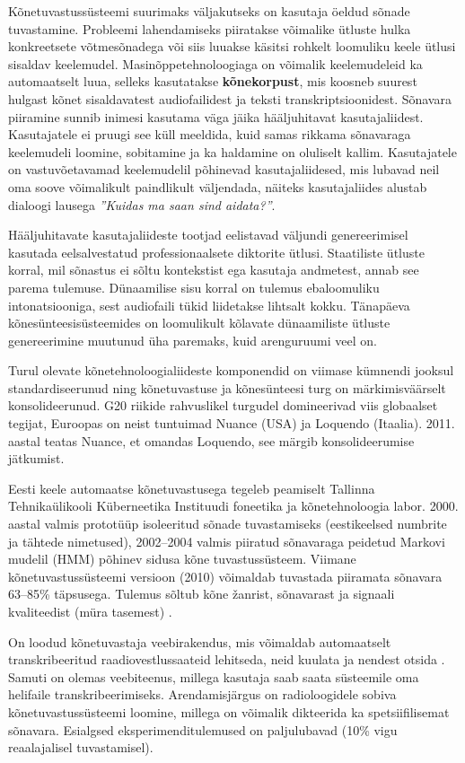 \documentclass[]{../metanetpaper}
\begin{document}
\begin{multicols}{2}
Kõnetuvastussüsteemi suurimaks väljakutseks on kasutaja öeldud sõnade tuvastamine. 
Probleemi lahendamiseks piiratakse võimalike ütluste hulka konkreetsete võtmesõnadega või siis luuakse käsitsi rohkelt loomuliku keele ütlusi sisaldav keelemudel. 
Masinõppetehnoloogiaga on võimalik keelemudeleid ka automaatselt luua, selleks kasutatakse \textbf{kõnekorpust}, mis koosneb suurest hulgast kõnet sisaldavatest audiofailidest ja teksti transkriptsioonidest. 
Sõnavara piiramine sunnib inimesi kasutama väga jäika hääljuhitavat kasutajaliidest. 
Kasutajatele ei pruugi see küll meeldida, kuid samas rikkama sõnavaraga keelemudeli loomine, sobitamine ja ka haldamine on oluliselt kallim. 
Kasutajatele on vastuvõetavamad keelemudelil põhinevad kasutajaliidesed, mis lubavad neil oma soove võimalikult paindlikult väljendada, näiteks kasutajaliides alustab dialoogi lausega \textit{''Kuidas ma saan sind aidata?''}. 

Hääljuhitavate kasutajaliideste tootjad eelistavad väljundi genereerimisel kasutada eelsalvestatud professionaalsete diktorite ütlusi. 
Staatiliste ütluste korral, mil sõnastus ei sõltu kontekstist ega kasutaja andmetest, annab see parema tulemuse. 
Dünaamilise sisu korral on tulemus ebaloomuliku intonatsiooniga, sest audiofaili tükid liidetakse lihtsalt kokku. 
Tänapäeva kõnesünteesisüsteemides on loomulikult kõlavate dünaamiliste ütluste genereerimine muutunud üha paremaks, kuid arenguruumi veel on. 

Turul olevate kõnetehnoloogialiideste komponendid on viimase kümnendi jooksul standardiseerunud ning kõnetuvastuse ja kõnesünteesi turg on märkimisväärselt konsolideerunud. 
G20 riikide rahvuslikel turgudel domineerivad viis globaalset tegijat, Euroopas on neist tuntuimad Nuance (USA) ja Loquendo (Itaalia). 
2011. aastal teatas Nuance, et omandas Loquendo, see märgib konsolideerumise jätkumist.

Eesti keele automaatse kõnetuvastusega tegeleb peamiselt Tallinna Tehnikaülikooli Küberneetika Instituudi foneetika ja kõnetehnoloogia labor. 
2000. aastal valmis prototüüp isoleeritud sõnade tuvastamiseks (eestikeelsed numbrite ja tähtede nimetused), 2002--2004 valmis piiratud sõnavaraga peidetud Markovi mudelil (HMM) põhinev sidusa kõne tuvastussüsteem. 
Viimane kõnetuvastussüsteemi versioon (2010) võimaldab tuvastada piiramata sõnavara 63--85\% täpsusega. Tulemus sõltub kõne žanrist, sõnavarast ja signaali kvaliteedist (müra tasemest) \cite{Phon}.

On loodud kõnetuvastaja veebirakendus, mis võimaldab automaatselt transkribeeritud raadiovestlussaateid lehitseda, neid kuulata ja nendest otsida . 
Samuti on olemas veebiteenus, millega kasutaja saab saata süsteemile oma helifaile transkribeerimiseks. 
Arendamisjärgus on radioloogidele sobiva kõnetuvastussüsteemi loomine, millega on võimalik dikteerida ka spetsiifilisemat sõnavara. 
Esialgsed eksperimenditulemused on paljulubavad (10\% vigu reaalajalisel tuvastamisel). 


\end{multicols}
\end{document}
